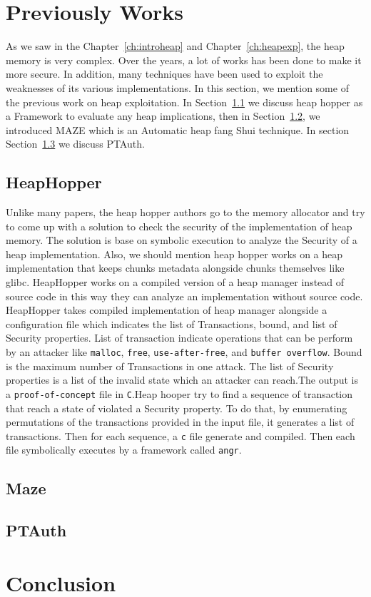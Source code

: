 \documentclass{masterthesis}
\newcommand*\libc{glibc}
\newcommand{\refToChapter}[1]{Chapter~\ref{ch:#1}\xspace}
\newcommand{\refToSection}[1]{Section~\ref{sect:#1}\xspace}
\begin{document}
\chapter{Previously Works}
As we saw in the \refToChapter{introheap} and \refToChapter{heapexp}, the heap memory is very complex. Over the years, a lot of works has been done to make it more secure. In addition, many techniques have been used to exploit the weaknesses of its various implementations. In this section, we mention some of the previous work on heap exploitation. In \refToSection{heaphopper} we discuss heap hopper as a Framework to evaluate any heap implications, then in \refToSection{maze}, we introduced MAZE which is an Automatic heap fang Shui technique. In section \refToSection{ptauth} we discuss PTAuth.

\section{HeapHopper}
\label{sect:heaphopper}
Unlike many papers, the heap hopper authors go to the memory allocator and try to come up with a solution to check the security of the implementation of heap memory. The solution is base on symbolic execution to analyze the Security of a heap implementation. Also, we should mention heap hopper works on a heap implementation that keeps chunks metadata alongside chunks themselves like \libc{}. HeapHopper works on a compiled version of a heap manager instead of source code in this way they can analyze an implementation without source code. HeapHopper takes compiled implementation of heap manager alongside a configuration file which indicates the list of Transactions, bound, and list of Security properties. List of transaction indicate operations that can be perform by an attacker like \lstinline{malloc}, \lstinline{free}, \lstinline{use-after-free}, and \lstinline{buffer overflow}. Bound is the maximum number of Transactions in one attack. The list of Security properties is a list of the invalid state which an attacker can reach.The output is a \lstinline{proof-of-concept} file in \lstinline{C}.Heap hooper try to find a sequence of transaction that reach a state of violated a Security property. To do that, by enumerating permutations of the transactions provided in the input file, it generates a list of transactions. Then for each sequence, a \lstinline{c} file generate and compiled. Then each file symbolically executes by a framework called \lstinline{angr}.

\section{Maze}
\label{sect:maze}
\section{PTAuth}
\label{sect:ptauth}
\chapter{Conclusion}

% 
% 
\end{document}
